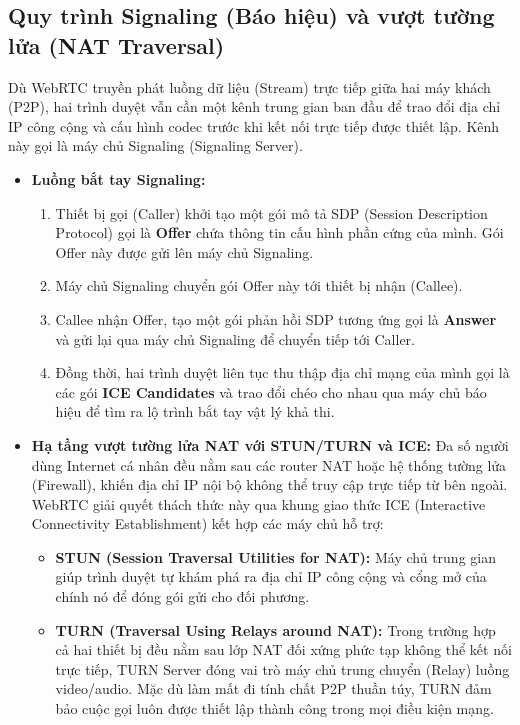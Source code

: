 \documentclass[a4paper,12pt]{report}
\begin{document}
\subsection{Quy trình Signaling (Báo hiệu) và vượt tường lửa (NAT Traversal)}
Dù WebRTC truyền phát luồng dữ liệu (Stream) trực tiếp giữa hai máy khách (P2P), hai trình duyệt vẫn cần một kênh trung gian ban đầu để trao đổi địa chỉ IP công cộng và cấu hình codec trước khi kết nối trực tiếp được thiết lập. Kênh này gọi là máy chủ Signaling (Signaling Server).
\begin{itemize}
    \item \textbf{Luồng bắt tay Signaling:}
    \begin{enumerate}
        \item Thiết bị gọi (Caller) khởi tạo một gói mô tả SDP (Session Description Protocol) gọi là \textbf{Offer} chứa thông tin cấu hình phần cứng của mình. Gói Offer này được gửi lên máy chủ Signaling.
        \item Máy chủ Signaling chuyển gói Offer này tới thiết bị nhận (Callee).
        \item Callee nhận Offer, tạo một gói phản hồi SDP tương ứng gọi là \textbf{Answer} và gửi lại qua máy chủ Signaling để chuyển tiếp tới Caller.
        \item Đồng thời, hai trình duyệt liên tục thu thập địa chỉ mạng của mình gọi là các gói \textbf{ICE Candidates} và trao đổi chéo cho nhau qua máy chủ báo hiệu để tìm ra lộ trình bắt tay vật lý khả thi.
    \end{enumerate}
    \item \textbf{Hạ tầng vượt tường lửa NAT với STUN/TURN và ICE:}
    Đa số người dùng Internet cá nhân đều nằm sau các router NAT hoặc hệ thống tường lửa (Firewall), khiến địa chỉ IP nội bộ không thể truy cập trực tiếp từ bên ngoài. WebRTC giải quyết thách thức này qua khung giao thức ICE (Interactive Connectivity Establishment) kết hợp các máy chủ hỗ trợ:
    \begin{itemize}
        \item \textbf{STUN (Session Traversal Utilities for NAT):} Máy chủ trung gian giúp trình duyệt tự khám phá ra địa chỉ IP công cộng và cổng mở của chính nó để đóng gói gửi cho đối phương.
        \item \textbf{TURN (Traversal Using Relays around NAT):} Trong trường hợp cả hai thiết bị đều nằm sau lớp NAT đối xứng phức tạp không thể kết nối trực tiếp, TURN Server đóng vai trò máy chủ trung chuyển (Relay) luồng video/audio. Mặc dù làm mất đi tính chất P2P thuần túy, TURN đảm bảo cuộc gọi luôn được thiết lập thành công trong mọi điều kiện mạng.
    \end{itemize}
\end{itemize}
\end{document}
